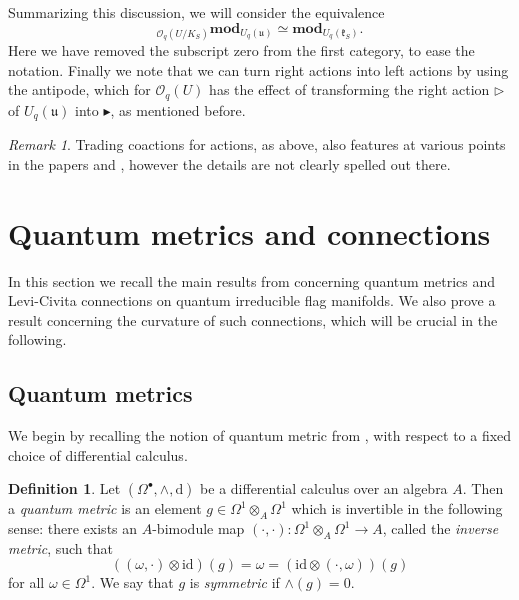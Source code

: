 \documentclass[a4paper,12pt,reqno,english]{amsart}
\numberwithin{equation}{section}
\numberwithin{figure}{section}
\theoremstyle{plain}
\theoremstyle{plain}
\theoremstyle{plain}
\theoremstyle{plain}
\theoremstyle{plain}
\theoremstyle{definition}
\newtheorem{definition}[theorem]{Definition}
\theoremstyle{definition}
\theoremstyle{definition}
\theoremstyle{remark}
\newtheorem{remark}[theorem]{Remark}
\theoremstyle{definition}
\newcommand{\Uqu}{U_q(\mathfrak{u})}
\newcommand{\UqkS}{U_q(\mathfrak{k}_S)}
\newcommand{\OqU}{\mathcal{O}_q(U)}
\newcommand{\Oqflag}{\mathcal{O}_q(U / K_S)}
\newcommand{\id}{\mathrm{id}}
\newcommand{\diff}{\mathrm{d}}
\newcommand{\wedgemap}{\mathord{\wedge}}
\newcommand{\catfive}{{}_{\Oqflag} \mathbf{mod}_{\Uqu}}
\newcommand{\catsix}{\mathbf{mod}_{\UqkS}}
\begin{document}
Summarizing this discussion, we will consider the equivalence
\begin{equation}
\label{eq:categorical-equivalence}
\catfive \simeq \catsix.
\end{equation}
Here we have removed the subscript zero from the first category, to ease the notation.
Finally we note that we can turn right actions into left actions by using the antipode, which for $\OqU$ has the effect of transforming the right action $\triangleright$ of $\Uqu$ into $\blacktriangleright$, as mentioned before.

\begin{remark}
Trading coactions for actions, as above, also features at various points in the papers \cite{holomorphic-relative} and \cite{levicivita-irreducible}, however the details are not clearly spelled out there.
\end{remark}

\section{Quantum metrics and connections}
\label{sec:metrics-connections}

In this section we recall the main results from \cite{levicivita-irreducible} concerning quantum metrics and Levi-Civita connections on quantum irreducible flag manifolds.
We also prove a result concerning the curvature of such connections, which will be crucial in the following.

\subsection{Quantum metrics}

We begin by recalling the notion of quantum metric from \cite[Definition 1.15]{quantum-book}, with respect to a fixed choice of differential calculus.

\begin{definition}
Let $(\Omega^\bullet, \wedgemap, \diff)$ be a differential calculus over an algebra $A$.
Then a \emph{quantum metric} is an element $g \in \Omega^1 \otimes_A \Omega^1$ which is invertible in the following sense: there exists an $A$-bimodule map $(\cdot, \cdot) : \Omega^1 \otimes_A \Omega^1 \to A$, called the \emph{inverse metric}, such that
\[
\left( (\omega, \cdot) \otimes \id \right) (g) = \omega = \left( \id \otimes (\cdot, \omega) \right) (g)
\]
for all $\omega \in \Omega^1$. We say that $g$ is \emph{symmetric} if $\wedgemap(g) = 0$.
\end{definition}
\end{document}
